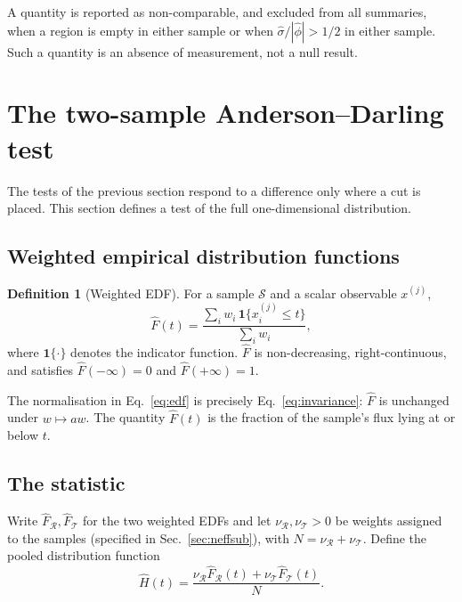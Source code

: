 \documentclass[11pt,a4paper]{article}
\theoremstyle{definition}
\newtheorem{definition}{Definition}[section]
\theoremstyle{plain}
\theoremstyle{remark}
\newcommand{\Ind}{\mathbf{1}}
\newcommand{\Rr}{\mathcal{R}}
\newcommand{\Tt}{\mathcal{T}}
\begin{document}
A quantity is reported as non-comparable, and excluded from all summaries, when
a region is empty in either sample or when $\hat{\sigma}/|\hat{\phi}| > 1/2$ in
either sample. Such a quantity is an absence of measurement, not a null result.

\section{The two-sample Anderson--Darling test}
\label{sec:ad}

The tests of the previous section respond to a difference only where a cut is
placed. This section defines a test of the full one-dimensional distribution.

\subsection{Weighted empirical distribution functions}

\begin{definition}[Weighted EDF]
For a sample $\mathcal{S}$ and a scalar observable $x^{(j)}$,
\begin{equation}
  \hat{F}(t) = \frac{\sum_{i} w_i\, \Ind\{x^{(j)}_i \le t\}}{\sum_{i} w_i},
  \label{eq:edf}
\end{equation}
where $\Ind\{\cdot\}$ denotes the indicator function. $\hat{F}$ is
non-decreasing, right-continuous, and satisfies $\hat{F}(-\infty)=0$ and
$\hat{F}(+\infty)=1$.
\end{definition}

The normalisation in Eq.~\eqref{eq:edf} is precisely Eq.~\eqref{eq:invariance}:
$\hat{F}$ is unchanged under $w \mapsto aw$. The quantity $\hat{F}(t)$ is the
fraction of the sample's flux lying at or below $t$.

\subsection{The statistic}

Write $\hat{F}_\Rr, \hat{F}_\Tt$ for the two weighted EDFs and let
$\nu_\Rr, \nu_\Tt > 0$ be weights assigned to the samples (specified in
Sec.~\ref{sec:neffsub}), with $N = \nu_\Rr + \nu_\Tt$. Define the pooled
distribution function
\begin{equation}
  \hat{H}(t) = \frac{\nu_\Rr \hat{F}_\Rr(t) + \nu_\Tt \hat{F}_\Tt(t)}{N}.
\end{equation}
\end{document}
